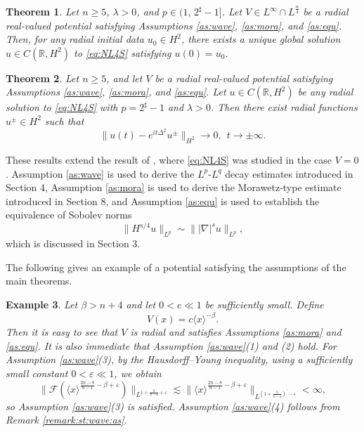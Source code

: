 \documentclass[11pt,a4paper]{article}
\numberwithin{equation}{section}
\newtheorem{theorem}{Theorem}[section]
\newtheorem{example}[theorem]{Example}
\begin{document}
\begin{theorem}\label{th:global}
Let $n \geq 5$, $\lambda > 0$, and $p \in (1, \, 2^{\sharp} - 1]$. Let $V \in L^{\infty} \cap L^{\frac{n}{4}}$ be a radial real-valued potential satisfying Assumptions \ref{as:wave}, \ref{as:mora}, and \ref{as:equ}. Then, for any radial initial data $u_{0} \in H^{2}$, there exists a unique global solution $u\in C(\mathbb{R}, H^{2})$ to \eqref{eq:NL4S} satisfying $u(0) = u_{0}$.
\end{theorem}

\begin{theorem}\label{th:scattering}
Let $n \geq 5$, and let $V$ be a radial real-valued potential satisfying Assumptions \ref{as:wave}, \ref{as:mora}, and \ref{as:equ}. Let $u \in C(\mathbb{R}, H^{2})$ be any radial solution to \eqref{eq:NL4S} with $p = 2^{\sharp}-1$ and $\lambda > 0$. Then there exist radial functions $u^{\pm} \in H^{2}$ such that
\[
 \|u(t) - e^{it\Delta^{2}}u^{\pm} \|_{H^{2}}\rightarrow 0 ,\ \ t \rightarrow \pm \infty.
\]
\end{theorem}

These results extend the result of \cite{Pau}, where \eqref{eq:NL4S} was studied in the case $V = 0$. Assumption \ref{as:wave} is used to derive the $L^{p}$-$L^{q}$ decay estimates introduced in Section 4, Assumption \ref{as:mora} is used to derive the Morawetz-type estimate introduced in Section 8, and Assumption \ref{as:equ} is used to establish the equivalence of Sobolev norms
\[
\|H^{s/4}u\|_{L^{p}} \sim \||\nabla|^{s}u\|_{L^{p}},
\]
which is discussed in Section 3.

The following gives an example of a potential satisfying the assumptions of the main theorems.

\begin{example}
Let $\beta > n + 4$ and let $0 < c \ll 1$ be sufficiently small. Define
\[
 V(x) = c\langle x \rangle^{-\beta}.
\]
Then it is easy to see that $V$ is radial and satisfies Assumptions \ref{as:mora} and \ref{as:equ}. It is also immediate that Assumption \ref{as:wave}(1) and (2) hold. For Assumption \ref{as:wave}(3), by the Hausdorff--Young inequality, using a sufficiently small constant $0 < \varepsilon \ll 1$, we obtain
\[
 \|\mathcal{F}\left( \langle x \rangle^{\frac{2n-8}{n-1} -\beta + \varepsilon} \right)\|_{L^{1 + \frac{3}{n-4} + \varepsilon}} \lesssim \|\langle x \rangle^{\frac{2n-8}{n-1} -\beta + \varepsilon}\|_{L^{(1 + \frac{3}{n-4})^{\prime} - \varepsilon}} < \infty,
\]
so Assumption \ref{as:wave}(3) is satisfied. Assumption \ref{as:wave}(4) follows from Remark \ref{remark:st:wave:as}.
\end{example}
\end{document}
